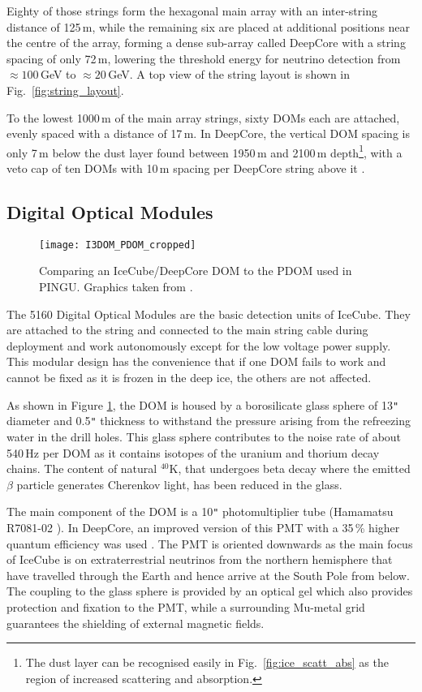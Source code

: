 Eighty of those strings form the hexagonal main array with an inter-string 
distance of 125\,m, while the remaining six are placed at additional positions 
near the centre of the array, forming a dense sub-array called DeepCore with a
string spacing 
of only 72\,m, lowering the threshold energy for neutrino detection from 
$\approx 100$\,GeV to $\approx 20$\,GeV. A top view of the string layout is 
shown in Fig.~\ref{fig:string_layout}.

To the lowest 1000\,m of the main array strings, sixty DOMs each are attached, 
evenly spaced with a distance of 17\,m. In DeepCore, the vertical DOM spacing 
is only 7\,m below the dust layer found between 1950\,m and 2100\,m 
depth\footnote{The dust layer can be recognised easily in 
Fig.~\ref{fig:ice_scatt_abs} as the region of increased scattering and 
absorption.}, with a veto cap of ten DOMs with 10\,m spacing per DeepCore 
string above it \cite{I3Design,DCDesign}.


\subsection{Digital Optical Modules}
\label{sec:ICDOM}

\begin{figure}[htp]
 \centering
 \texttt{[image: I3DOM\_PDOM\_cropped]}
 \caption{Comparing an IceCube/DeepCore DOM to the PDOM used in PINGU. Graphics 
taken from \cite{PDOM_Aachen}.}
 \label{fig:DOM}
\end{figure}

The 5160 Digital Optical Modules are the basic detection units of IceCube. They 
are attached to the string and connected to the main string cable during 
deployment and work autonomously except for the low voltage power supply. This 
modular design has the convenience that if one DOM fails to work and cannot be 
fixed as it is frozen in the deep ice, the others are not affected.

As shown in Figure \ref{fig:DOM}, the DOM is housed by a borosilicate glass 
sphere of 13\verb+"+ diameter and 0.5\verb+"+ thickness to withstand the 
pressure arising from the refreezing water in the drill holes. This glass sphere 
 contributes to the noise rate of about 540\,Hz per DOM as it contains
isotopes of the uranium and thorium decay chains. The content of natural 
$^{40}\mathrm{K}$, that undergoes beta decay where the emitted $\beta$ particle
generates Cherenkov light, has been reduced in the glass.

The main component of the DOM is a 10\verb+"+ photomultiplier tube (Hamamatsu 
R7081-02 \cite{PMTpaper,PMTdata}). In DeepCore, an improved version of this PMT 
with a 35\,\% higher quantum efficiency was used \cite{DCDesign}. The PMT is 
oriented downwards as the main focus of IceCube is on extraterrestrial neutrinos 
from the northern hemisphere that have travelled through the Earth and hence 
arrive at the South Pole from below. The coupling to the glass sphere is 
provided by an optical gel which also provides protection and fixation to the 
PMT, while a surrounding Mu-metal grid guarantees the shielding of external 
magnetic fields.

